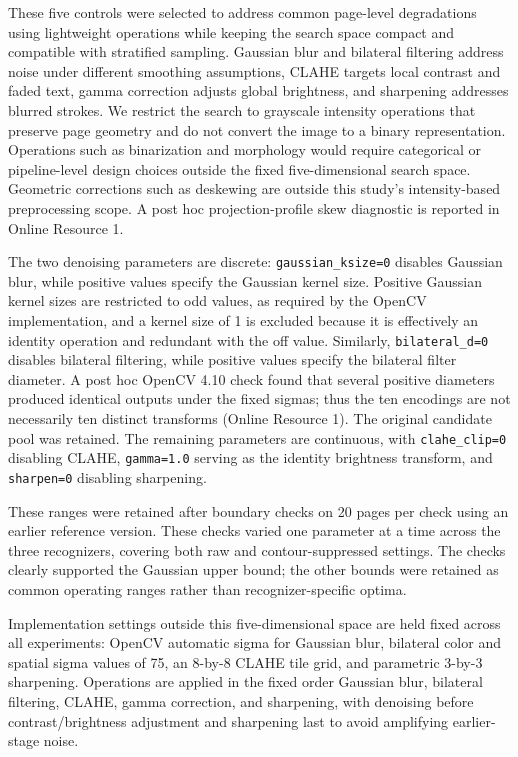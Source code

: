 \documentclass[pdflatex,sn-basic,Numbered,iicol]{sn-jnl}
\begin{document}
These five controls were selected to address common page-level degradations using lightweight operations while keeping the search space compact and compatible with stratified sampling. Gaussian blur and bilateral filtering address noise under different smoothing assumptions, CLAHE targets local contrast and faded text, gamma correction adjusts global brightness, and sharpening addresses blurred strokes. We restrict the search to grayscale intensity operations that preserve page geometry and do not convert the image to a binary representation. Operations such as binarization and morphology would require categorical or pipeline-level design choices outside the fixed five-dimensional search space. Geometric corrections such as deskewing are outside this study's intensity-based preprocessing scope. A post hoc projection-profile skew diagnostic is reported in Online Resource 1.

The two denoising parameters are discrete: \texttt{gaussian\_ksize=0} disables Gaussian blur, while positive values specify the Gaussian kernel size. Positive Gaussian kernel sizes are restricted to odd values, as required by the OpenCV implementation, and a kernel size of 1 is excluded because it is effectively an identity operation and redundant with the off value. Similarly, \texttt{bilateral\_d=0} disables bilateral filtering, while positive values specify the bilateral filter diameter. A post hoc OpenCV 4.10 check found that several positive diameters produced identical outputs under the fixed sigmas; thus the ten encodings are not necessarily ten distinct transforms (Online Resource 1). The original candidate pool was retained. The remaining parameters are continuous, with \texttt{clahe\_clip=0} disabling CLAHE, \texttt{gamma=1.0} serving as the identity brightness transform, and \texttt{sharpen=0} disabling sharpening.

These ranges were retained after boundary checks on 20 pages per check using an earlier reference version. These checks varied one parameter at a time across the three recognizers, covering both raw and contour-suppressed settings. The checks clearly supported the Gaussian upper bound; the other bounds were retained as common operating ranges rather than recognizer-specific optima.

Implementation settings outside this five-dimensional space are held fixed across all experiments: OpenCV automatic sigma for Gaussian blur, bilateral color and spatial sigma values of 75, an 8-by-8 CLAHE tile grid, and parametric 3-by-3 sharpening. Operations are applied in the fixed order Gaussian blur, bilateral filtering, CLAHE, gamma correction, and sharpening, with denoising before contrast/brightness adjustment and sharpening last to avoid amplifying earlier-stage noise.
\end{document}
